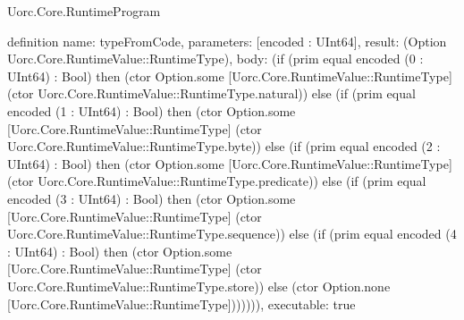 \begin{lexlean}{Uorc.Core.RuntimeProgram}
\begin{semanticmodule}
definition{
  name: typeFromCode,
  parameters: [encoded : UInt64],
  result: (Option Uorc.Core.RuntimeValue::RuntimeType),
  body: (if (prim equal encoded (0 : UInt64) : Bool) then (ctor Option.some [Uorc.Core.RuntimeValue::RuntimeType] (ctor Uorc.Core.RuntimeValue::RuntimeType.natural)) else (if (prim equal encoded (1 : UInt64) : Bool) then (ctor Option.some [Uorc.Core.RuntimeValue::RuntimeType] (ctor Uorc.Core.RuntimeValue::RuntimeType.byte)) else (if (prim equal encoded (2 : UInt64) : Bool) then (ctor Option.some [Uorc.Core.RuntimeValue::RuntimeType] (ctor Uorc.Core.RuntimeValue::RuntimeType.predicate)) else (if (prim equal encoded (3 : UInt64) : Bool) then (ctor Option.some [Uorc.Core.RuntimeValue::RuntimeType] (ctor Uorc.Core.RuntimeValue::RuntimeType.sequence)) else (if (prim equal encoded (4 : UInt64) : Bool) then (ctor Option.some [Uorc.Core.RuntimeValue::RuntimeType] (ctor Uorc.Core.RuntimeValue::RuntimeType.store)) else (ctor Option.none [Uorc.Core.RuntimeValue::RuntimeType])))))),
  executable: true
}


\end{semanticmodule}
\end{lexlean}
